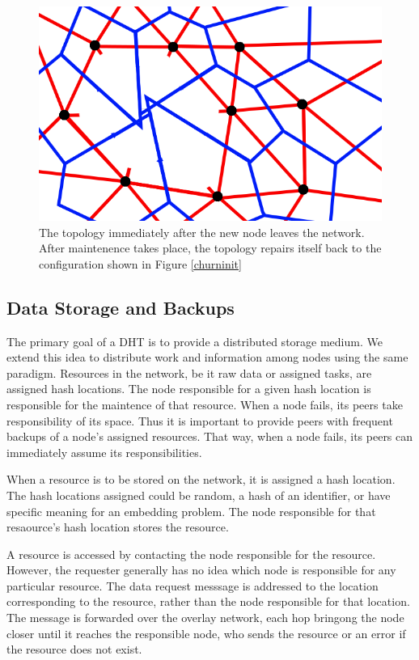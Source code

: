 \documentclass[11pt]{IEEEtran} %
\begin{document}
\begin{figure}
    \includegraphics[width=\linewidth]{voronoi-churn1}
    \caption{The topology immediately after the new node leaves the network. After maintenence takes place, the topology repairs itself back to the configuration shown in Figure \ref{churninit}}
    \label{churndrop}
\end{figure}


\subsection{Data Storage and Backups}
The primary goal of a DHT is to provide a distributed storage medium. We extend this idea  to distribute work and information among nodes using the same paradigm. Resources in the network, be it raw data or assigned tasks, are assigned hash locations. The node responsible for a given hash location is responsible for the maintence of that resource. When a node fails, its peers take responsibility of its space. Thus it is important to provide peers with frequent backups of a node's assigned resources.  That way, when a node fails, its peers can immediately assume its responsibilities.

When a resource is to be stored on the network, it is assigned a hash location. The hash locations assigned could be random, a hash of an identifier, or have specific meaning for an embedding problem. The node responsible for that resaource's hash location stores the resource.

A resource is accessed by contacting the node responsible for the resource.  However, the requester generally has no idea which node is responsible for any particular resource.  The data request messsage is addressed to the location corresponding to the resource, rather than the node responsible for that location.  The message is forwarded over the overlay network, each hop bringong the node closer until it reaches the responsible node, who sends the resource or an error if the resource does not exist.
\end{document}
